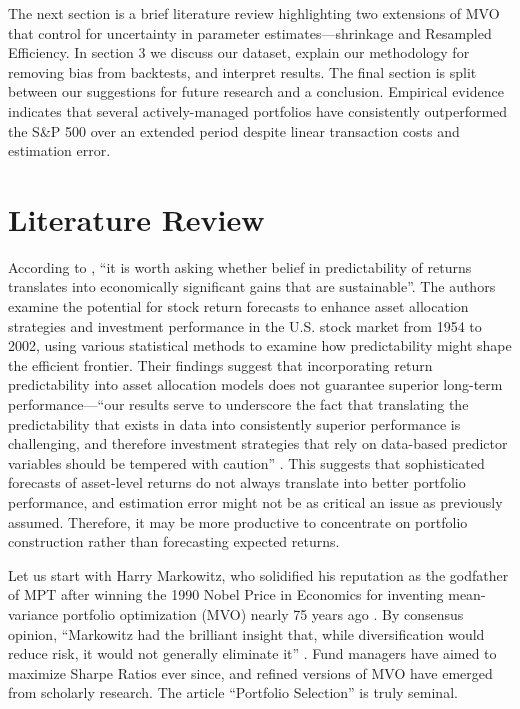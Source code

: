\documentclass[12pt,letterpaper]{article}
\begin{document}
The next section is a brief literature review highlighting two extensions of MVO that control for uncertainty in parameter estimates---shrinkage and Resampled Efficiency. In section 3 we discuss our dataset, explain our methodology for removing bias from backtests, and interpret results. The final section is split between our suggestions for future research and a conclusion. Empirical evidence indicates that several actively-managed portfolios have consistently outperformed the S\&P 500 over an extended period despite linear transaction costs and estimation error.

\section{Literature Review}

According to , “it is worth asking whether belief in predictability of returns translates into economically significant gains that are sustainable”. The authors examine the potential for stock return forecasts to enhance asset allocation strategies and investment performance in the U.S. stock market from 1954 to 2002, using various statistical methods to examine how predictability might shape the efficient frontier. Their findings suggest that incorporating return predictability into asset allocation models does not guarantee superior long-term performance---“our results serve to underscore the fact that translating the predictability that exists in data into consistently superior performance is challenging, and therefore investment strategies that rely on data-based predictor variables should be tempered with caution” \cite{handa06}. This suggests that sophisticated forecasts of asset-level returns do not always translate into better portfolio performance, and estimation error might not be as critical an issue as previously assumed. Therefore, it may be more productive to concentrate on portfolio construction rather than forecasting expected returns.

Let us start with Harry Markowitz, who solidified his reputation as the godfather of MPT after winning the 1990 Nobel Price in Economics for inventing mean-variance portfolio optimization (MVO) nearly 75 years ago \cite{markowitz52}. By consensus opinion, “Markowitz had the brilliant insight that, while diversification would reduce risk, it would not generally eliminate it” \cite{rubinstein02}. Fund managers have aimed to maximize Sharpe Ratios ever since, and refined versions of MVO have emerged from scholarly research. The article “Portfolio Selection” \cite{markowitz52} is truly seminal.
\end{document}
